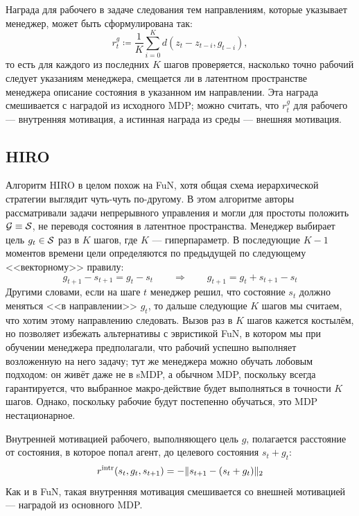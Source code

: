 Награда для рабочего в задаче следования тем направлениям, которые указывает менеджер, может быть сформулирована так:
$$r^{g}_t \coloneqq \frac{1}{K}\sum_{i = 0}^{K} d(z_t - z_{t - i}, g_{t - i}),$$
то есть для каждого из последних $K$ шагов проверяется, насколько точно рабочий следует указаниям менеджера, смещается ли в латентном пространстве менеджера описание состояния в указанном им направлении. Эта награда смешивается с наградой из исходного MDP; можно считать, что $r^{g}_t$ для рабочего --- внутренняя мотивация, а истинная награда из среды --- внешняя мотивация.

\subsection{HIRO}

Алгоритм HIRO в целом похож на FuN, хотя общая схема иерархической стратегии выглядит чуть-чуть по-другому. В этом алгоритме авторы рассматривали задачи непрерывного управления и могли для простоты положить $\mathcal{G} \equiv \mathcal{S}$, не переводя состояния в латентное пространства. Менеджер выбирает цель $g_t \in \mathcal{S}$ раз в $K$ шагов, где $K$ --- гиперпараметр. В последующие $K - 1$ моментов времени цели определяются по предыдущей по следующему <<векторному>> правилу:
$$g_{t + 1} - s_{t + 1} = g_t - s_t \qquad \Rightarrow \qquad g_{t + 1} = g_t + s_{t + 1} - s_t$$
Другими словами, если на шаге $t$ менеджер решил, что состояние $s_t$ должно меняться <<в направлении>> $g_t$, то дальше следующие $K$ шагов мы считаем, что хотим этому направлению следовать. Вызов раз в $K$ шагов кажется костылём, но позволяет избежать альтернативы с эвристикой FuN, в котором мы при обучении менеджера предполагали, что рабочий успешно выполняет возложенную на него задачу; тут же менеджера можно обучать лобовым подходом: он живёт даже не в sMDP, а обычном MDP, поскольку всегда гарантируется, что выбранное макро-действие будет выполняться в точности $K$ шагов. Однако, поскольку рабочие будут постепенно обучаться, это MDP нестационарное.

Внутренней мотивацией рабочего, выполняющего цель $g$, полагается расстояние от состояния, в которое попал агент, до целевого состояния $s_t + g_t$:
$$r^{\mathrm{intr}}(s_t, g_t, s_{t+1}) = -\|s_{t + 1} - (s_{t} + g_t)\|_2$$
Как и в FuN, такая внутренняя мотивация смешивается со внешней мотивацией --- наградой из основного MDP. 


